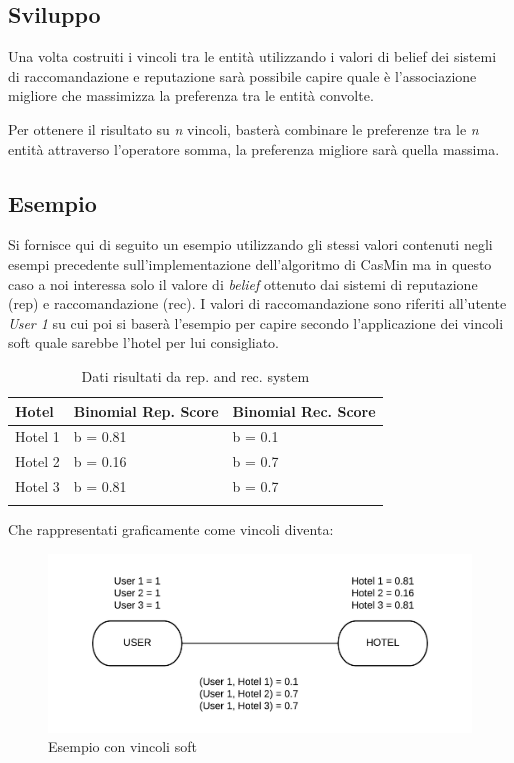 \documentclass{report}
\begin{document}
	\hypertarget{header-n240}{%
		\subsection{Sviluppo}\label{header-n240}}
		
	Una volta costruiti i vincoli tra le entità utilizzando i valori di belief dei sistemi di raccomandazione e reputazione sarà possibile capire quale è l'associazione migliore che massimizza la preferenza tra le entità convolte.
    \newline
    
    Per ottenere il risultato su \textit{n} vincoli, basterà combinare le preferenze tra le \textit{n} entità attraverso l'operatore somma, la preferenza migliore sarà quella massima. 

	
	\hypertarget{header-n241}{%
		\subsection{Esempio}\label{header-n241}}
	
	Si fornisce qui di seguito un esempio utilizzando gli stessi valori
	contenuti negli esempi precedente sull'implementazione dell'algoritmo
	di CasMin ma in questo caso a noi interessa solo il valore di
	\emph{belief} ottenuto dai sistemi di reputazione (rep) e
	raccomandazione (rec). I valori di raccomandazione sono riferiti
	all'utente \emph{User 1} su cui poi si baserà l'esempio per capire
	secondo l'applicazione dei vincoli soft quale sarebbe l'hotel per lui
	consigliato.
	
	\begin{longtable}[]{@{}|l|l|l|@{}}
		\hline
		\textbf{Hotel} & \textbf{Binomial Rep. Score} & \textbf{Binomial Rec. Score}\\ \hline
		Hotel 1 & b = 0.81 & b = 0.1 \\ \hline
		Hotel 2 & b = 0.16 & b = 0.7 \\ \hline
		Hotel 3 & b = 0.81 & b = 0.7 \\ \hline
		\caption[Dati risultati da rep. and rec. system]{Dati risultati da rep. and rec. system}
	\end{longtable}
	
	Che rappresentati graficamente come vincoli diventa:
	
	\begin{figure}[htbp]
		\centering
		\includegraphics{images/softcsp-bw.png}
		\caption{Esempio con vincoli soft}
	\end{figure}
	
\end{document}
